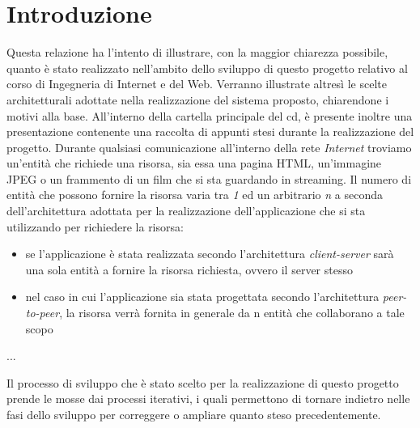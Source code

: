 \documentclass[a4paper, titlepage]{article}
\begin{document}
	\section{Introduzione}
	\begin{flushleft}
		Questa relazione ha l'intento di illustrare, con la maggior chiarezza possibile, quanto è stato realizzato nell'ambito dello sviluppo di questo progetto relativo al corso di Ingegneria di Internet e del Web. Verranno illustrate altresì le scelte architetturali adottate nella realizzazione del sistema proposto, chiarendone i motivi alla base. All'interno della cartella principale del cd, è presente inoltre una presentazione contenente una raccolta di appunti stesi durante la realizzazione del progetto.\newline
		Durante qualsiasi comunicazione all'interno della rete \textit{Internet} troviamo un'entità che richiede una risorsa, sia essa una pagina HTML, un'immagine JPEG o un frammento di un film che si sta guardando in streaming. Il numero di entità che possono fornire la risorsa varia tra \textit{1} ed un arbitrario \textit{n} a seconda dell'architettura adottata per la realizzazione dell'applicazione che si sta utilizzando per richiedere la risorsa:
		\begin{itemize}
			\item se l'applicazione è stata realizzata secondo l'architettura \textit{client-server} sarà una sola entità a fornire la risorsa richiesta, ovvero il server stesso
			\item nel caso in cui l'applicazione sia stata progettata secondo l'architettura \textit{peer-to-peer}, la risorsa verrà fornita in generale da n entità che collaborano a tale scopo
		\end{itemize}
	...
	
	Il processo di sviluppo che è stato scelto per la realizzazione di questo progetto prende le mosse dai processi iterativi, i quali permettono di tornare indietro nelle fasi dello sviluppo per correggere o ampliare quanto steso precedentemente.
	\end{flushleft}
\end{document}
